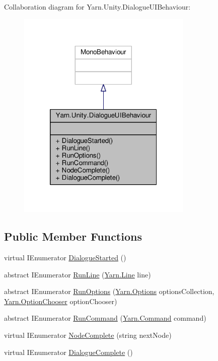 Collaboration diagram for Yarn.\-Unity.\-Dialogue\-U\-I\-Behaviour\-:
\nopagebreak
\begin{figure}[H]
\begin{center}
\leavevmode
\includegraphics[width=236pt]{dd/d1d/a00336}
\end{center}
\end{figure}
\subsection*{Public Member Functions}
\begin{DoxyCompactItemize}
\item 
virtual I\-Enumerator \hyperlink{a00038_af9d88ca81ac536d43046ca6572e3ff54}{Dialogue\-Started} ()
\item 
abstract I\-Enumerator \hyperlink{a00038_a754c6dd0bc67895d11f878fe4477d698}{Run\-Line} (\hyperlink{a00026_d6/d7d/a00161}{Yarn.\-Line} line)
\item 
abstract I\-Enumerator \hyperlink{a00038_ac5b29079f638f2ceb078627ef1e60004}{Run\-Options} (\hyperlink{a00026_dd/dae/a00163}{Yarn.\-Options} options\-Collection, \hyperlink{a00026_a39866cbb03c03a35805d598b5d4ad553}{Yarn.\-Option\-Chooser} option\-Chooser)
\item 
abstract I\-Enumerator \hyperlink{a00038_a3dffe84b9e7a10fdec6749baf697d111}{Run\-Command} (\hyperlink{a00026_d6/db8/a00158}{Yarn.\-Command} command)
\item 
virtual I\-Enumerator \hyperlink{a00038_a2900548a0704d39d4502a153945f4bef}{Node\-Complete} (string next\-Node)
\item 
virtual I\-Enumerator \hyperlink{a00038_aecc60aee9e9386da1f71fb183f43c52d}{Dialogue\-Complete} ()
\end{DoxyCompactItemize}


